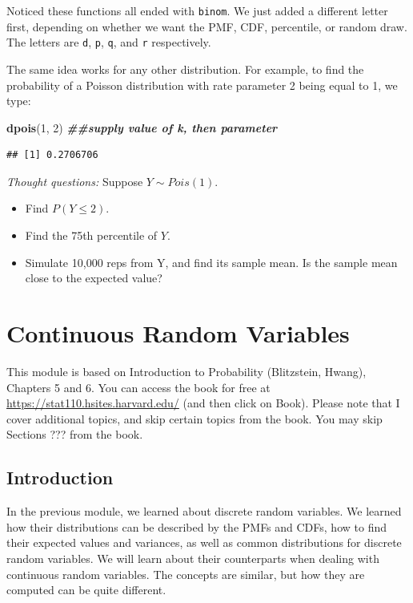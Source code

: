 \documentclass[
]{book}
\newenvironment{Shaded}{\begin{snugshade}}{\end{snugshade}}
\newcommand{\DecValTok}[1]{\textcolor[rgb]{0.00,0.00,0.81}{#1}}
\newcommand{\DocumentationTok}[1]{\textcolor[rgb]{0.56,0.35,0.01}{\textbf{\textit{#1}}}}
\newcommand{\FunctionTok}[1]{\textcolor[rgb]{0.13,0.29,0.53}{\textbf{#1}}}
\newcommand{\NormalTok}[1]{#1}
\providecommand{\tightlist}{%
  \setlength{\itemsep}{0pt}\setlength{\parskip}{0pt}}
\begin{document}
Noticed these functions all ended with \texttt{binom}. We just added a different letter first, depending on whether we want the PMF, CDF, percentile, or random draw. The letters are \texttt{d}, \texttt{p}, \texttt{q}, and \texttt{r} respectively.

The same idea works for any other distribution. For example, to find the probability of a Poisson distribution with rate parameter 2 being equal to 1, we type:

\begin{Shaded}
\begin{Highlighting}[]
\FunctionTok{dpois}\NormalTok{(}\DecValTok{1}\NormalTok{, }\DecValTok{2}\NormalTok{) }\DocumentationTok{\#\#supply value of k, then parameter}
\end{Highlighting}
\end{Shaded}

\begin{verbatim}
## [1] 0.2706706
\end{verbatim}

\emph{Thought questions:} Suppose \(Y \sim Pois(1)\).

\begin{itemize}
\tightlist
\item
  Find \(P(Y \leq 2)\).
\item
  Find the 75th percentile of \(Y\).
\item
  Simulate 10,000 reps from Y, and find its sample mean. Is the sample mean close to the expected value?
\end{itemize}

\chapter{Continuous Random Variables}\label{continuous-random-variables}

This module is based on Introduction to Probability (Blitzstein, Hwang), Chapters 5 and 6. You can access the book for free at \url{https://stat110.hsites.harvard.edu/} (and then click on Book). Please note that I cover additional topics, and skip certain topics from the book. You may skip Sections ??? from the book.

\section{Introduction}\label{introduction}

In the previous module, we learned about discrete random variables. We learned how their distributions can be described by the PMFs and CDFs, how to find their expected values and variances, as well as common distributions for discrete random variables. We will learn about their counterparts when dealing with continuous random variables. The concepts are similar, but how they are computed can be quite different.
\end{document}
